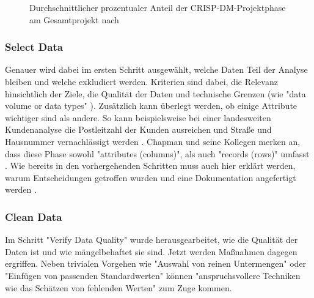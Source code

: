 \begin{figure}[H]
\centering
{}
\caption{Durchschnittlicher prozentualer Anteil der CRISP-DM-Projektphase am Gesamtprojekt nach \citep[S.~15; eigene Darstellung]{shearer_crisp-dm_2000}}
\label{fig:CRISP_DM_percent}
\end{figure}

\subsubsection{Select Data}
Genauer wird dabei im ersten Schritt ausgewählt, welche Daten Teil der Analyse bleiben und welche exkludiert werden. Kriterien sind dabei, die Relevanz hinsichtlich der Ziele, die Qualität der Daten und technische Grenzen \citep[S.~16]{shearer_crisp-dm_2000} (wie "data volume or data types" \citep[S.~21]{chapman_crisp-dm_2000}). Zusätzlich kann überlegt werden, ob einige Attribute wichtiger sind als andere. So kann beispielsweise bei einer landesweiten Kundenanalyse die Postleitzahl der Kunden ausreichen und Straße und Hausnummer vernachlässigt werden \citep[S.~16]{shearer_crisp-dm_2000}. Chapman und seine Kollegen merken an, dass diese Phase sowohl "attributes (columns)", als auch "records (rows)" umfasst \citep[S.21]{chapman_crisp-dm_2000}. Wie bereits in den vorhergehenden Schritten muss auch hier erklärt werden, warum Entscheidungen getroffen wurden und eine Dokumentation angefertigt werden \citep[S.~16]{shearer_crisp-dm_2000}.

\subsubsection{Clean Data}
Im Schritt "Verify Data Quality" wurde herausgearbeitet, wie die Qualität der Daten ist und wie mängelbehaftet sie sind. Jetzt werden Maßnahmen dagegen ergriffen. Neben trivialen Vorgehen wie "Auswahl von reinen Untermengen" oder "Einfügen von passenden Standardwerten" können "anspruchsvollere Techniken wie das Schätzen von fehlenden Werten" \citep[S.21; eigene Übersetzung]{chapman_crisp-dm_2000} zum Zuge kommen.

